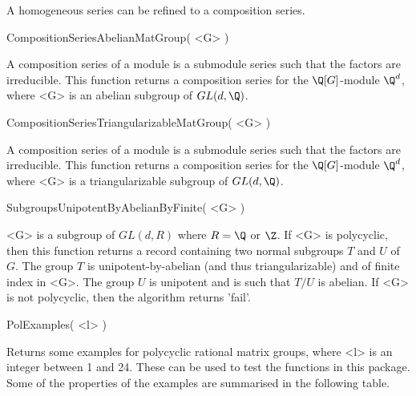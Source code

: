 A homogeneous series can be refined to a composition series.

\> CompositionSeriesAbelianMatGroup( <G> )

A composition series of a module is a submodule series such that 
the factors are irreducible. This function returns a 
composition series for the $\Q[G]$-module $\Q^d$, where <G> is an
abelian subgroup of $GL(d,\Q)$.

\> CompositionSeriesTriangularizableMatGroup( <G> )

A composition series of a module is a submodule series such that 
the factors are irreducible. This function returns a 
composition series for the $\Q[G]$-module $\Q^d$, where <G> is a
triangularizable subgroup of $GL(d,\Q)$.


%

\> SubgroupsUnipotentByAbelianByFinite( <G> )

<G> is  a subgroup of $GL(d,R)$ where $R=\Q$ or $\Z$.
If <G> is polycyclic, then 
this function returns a record containing two normal subgroups 
$T$ and $U$ of $G$.
The group $T$ is unipotent-by-abelian 
(and thus triangularizable) and 
of finite index in <G>. 
The group $U$ is unipotent and is such that $T/U$ is abelian.  
If <G> is not polycyclic, 
then the algorithm returns 'fail'. 


\> PolExamples( <l> )
 
Returns some examples for polycyclic rational matrix groups, where <l> 
is an integer
between 1 and 24. 
These can be used to test the functions in this package. 
Some of the
properties of the examples are summarised in the following table.

